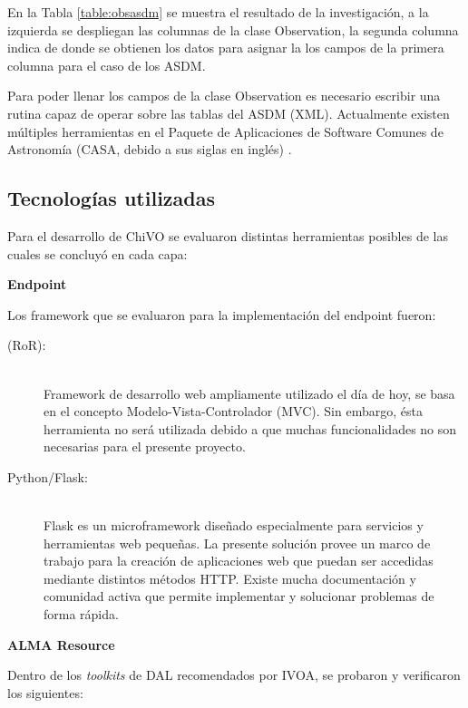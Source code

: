 En la Tabla \ref{table:obsasdm} se muestra el resultado de la investigación,
a la izquierda se despliegan las columnas de la clase Observation,
la segunda columna indica de donde se obtienen los datos para asignar la los campos
de la primera columna para el caso de los ASDM.

Para poder llenar los campos de la clase Observation es necesario escribir una
rutina capaz de operar sobre las tablas del ASDM (XML).
Actualmente existen múltiples herramientas en el Paquete de Aplicaciones de Software
Comunes de Astronomía (CASA, debido a sus siglas en inglés) \cite{petry2012analysing}.

\subsection{Tecnologías utilizadas}

Para el desarrollo de ChiVO se evaluaron distintas herramientas posibles de las
cuales se concluyó en cada capa:

\textbf{Endpoint}

Los framework que se evaluaron para la implementación del endpoint fueron:

\begin{description}
    \item[{\ror} (RoR):] \hfill \\
        Framework de desarrollo web ampliamente utilizado el día de hoy,
        se basa en el concepto Modelo-Vista-Controlador (MVC).
        Sin embargo, ésta herramienta no será utilizada debido
        a que muchas funcionalidades no son necesarias para el presente proyecto.
    \item[Python/Flask:] \hfill \\
        Flask es un microframework diseñado especialmente para servicios y
        herramientas web pequeñas.
        La presente solución provee un marco de trabajo para la creación de
        aplicaciones web que puedan ser accedidas mediante distintos métodos HTTP.
        Existe mucha documentación y comunidad activa que permite implementar y
        solucionar problemas de forma rápida.
\end{description}

\textbf{ALMA Resource}

Dentro de los \emph{toolkits} de DAL recomendados por IVOA,
se probaron y verificaron los siguientes:

